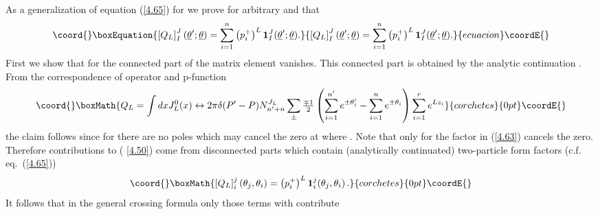 \documentclass[a4paper,a4paper]{article}
\def\proof{\noindent{\bfseries Proof. }}
\begin{document}
\proof%
As a generalization of equation (\ref{4.65}) for \coordHE{} we prove for
arbitrary \coordHE{} and \coordHE{} that 
\begin{equation}\coord{}\boxEquation{
\left[ Q_{L}\right] _{I}^{J}(\underline{\theta }^{\prime };\underline{\theta 
})=\sum_{i=1}^{n}\left( p_{i}^{+}\right) ^{L}\mathbf{1}_{I}^{J}(\underline{
\theta }^{\prime };\underline{\theta }).  \label{4.50}
}{
\left[ Q_{L}\right] _{I}^{J}(\underline{\theta }^{\prime };\underline{\theta 
})=\sum_{i=1}^{n}\left( p_{i}^{+}\right) ^{L}\mathbf{1}_{I}^{J}(\underline{
\theta }^{\prime };\underline{\theta }).  }{ecuacion}\coordE{}\end{equation}
First we show that for \coordHE{} the connected part of the matrix
element \coordHE{} vanishes. This connected
part is obtained by the analytic continuation \coordHE{}. From the correspondence of operator and p-function 
\[\coord{}\boxMath{
Q_{L}=\int dxJ_{L}^{0}(x)\leftrightarrow 2\pi \delta (P^{\prime
}-P)N_{n^{\prime }+n}^{J_{L}}\sum_{\pm }\tfrac{\mp 1}{2}\left(
\sum_{i=1}^{n^{\prime }}e^{\pm \theta _{i}^{\prime }}-\sum_{i=1}^{n}e^{\pm
\theta _{i}}\right) \sum_{i=1}^{r}e^{Lz_{i}} 
}{corchetes}{0pt}\coordE{}\]
the claim follows since for \coordHE{} there are no poles which may
cancel the zero at \coordHE{} where \coordHE{}. Note that only for \coordHE{} the factor \coordHE{} in (\ref{4.63}) cancels the zero. Therefore contributions to (%
\ref{4.50}) come from disconnected parts which contain (analytically
continuated) two-particle form factors (c.f. eq.~(\ref{4.65})) 
\[\coord{}\boxMath{
\left[ Q_{L}\right] _{i}^{j}(\theta _{j},\theta _{i})=\left(
p_{i}^{+}\right) ^{L}\mathbf{1}_{i}^{j}(\theta _{j},\theta _{i})\,. 
}{corchetes}{0pt}\coordE{}\]
It follows that in the general crossing formula only those terms with \coordHE{} contribute 
\end{document}
